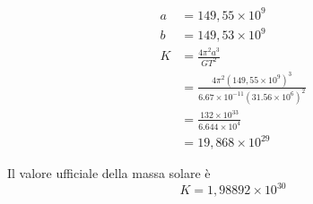 \documentclass[a4paper,11pt]{article}
\begin{document}
\begin{align*}
	a & = 149,55 \times 10^9 \\
	b & = 149,53 \times 10^9 \\
	K & = \frac{4 \pi^2 a^3}{GT^2}\\
	& = \frac{4 \pi^2 (149,55 \times 10^9)^3}{6.67 \times 10^{-11} (31.56 \times 10^6)^2}\\
	& = \frac{132 \times 10^{33}}{6.644 \times 10^4}\\
	& = 19,868 \times 10^{29}
\end{align*}

Il valore ufficiale della massa solare è
\[
	K = 1,98892 \times 10^{30}
\]
\end{document}

